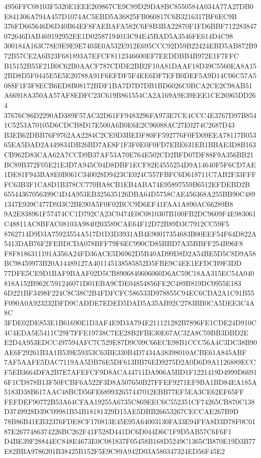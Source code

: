 \documentclass[UTF8,fontset=fandol,zihao=-4,a4paper]{ctexart}
\begin{document}
{{4956FFC08103F5320E1EEE269867CE9C89D29DA8BC8550584A034A77A27DB0E841306A794A457D1074AC5EBD5A36825FB060817C6B3216317BF6EC9B
376FD665646D6D40B64EF8FAEBAFA582C6F8B3BA22870F1FD6BBF712283847072646DAB469192952EE1D02587194013C94E45BAD5A3546FE614D4C98
300184A163C78E9E9E9E7403E0A532E912E695CCC92D59B22424EBD5AB872B972B57CE2A6B23F681893A7EFCF8112346600EF7EEDDBB4B972E1F7FFC
B15152B55F21B0C62B0AACF787CDDE2BB2F10A81DAAF18D39C5560EA8A152BD8D5F0445E5E5E20788A91F6EFDF5F4EE6DF7EFB0DEF5A9D14C06C57A5
088F1F3F8ECB6ED8B08172BDF1BA7D7D7DB1BD6026C0BCA2CE2C98AB51A66918A350AA57AF8EDFC23C619B861554CA2A169A9E39EEE1CE26965DD264
37676C86D2290AD389F57AC32D61FF9483296FA973E7CE4CCC4E3767D97B8541C5253A70105D6CDCB8D17E500A6B0E6E2C96088AC27E0274C2687D43
B3EB62DBB76F9762AA2284C2CE9D3BEDF80FF592776F0FD09EEA78117B05365EA5DAD2A449834DB26BD7AE8F1F3F0E0F0FD7EBE631EB1BBAE3D8B163
CB962D83CAA62A7CCD9B37AF53A70E764E502CD2BFD07DF88F9A356BB21BC89B372F05E21E3D7A945C04D8DBF1ECF82E4555254D9A14640F5F6CD7AE
1DE81F943BA8E0B061C340028D9423CE024C557FBFC6D618711C7AB2F33FFFFC63B3F1CA8D1B378CC770BA8CB1EB4ABA74E95897559B6512EFDEBD2B
65544367056399C4D4A953EB325635126DBA64D5758CAE456368A255BB90C4891347E939C477D933C2BE90A5F0F02BCC9D6EF41FAA1A890AC66289B8
9A2E838961F57474CC1D792CA23C0474E0C0810307B100FB2DC9609F4E983061C48811AC8BFAC08103A9840203589CAE64F12D72B89D3C7912CC59F5
8762714D9D3A75923554A517D1D3D3931AB4E90017354683B00EEF54F64D822A5413DAB76F2FEBDCDA078BFF79F6EC990CD85BBD7A35BBFF254B96F8
F8F8186311191A356A24FD36ACE5D6962D5B40AD99D8D2A54BE5D5C8D9A58BC98459973B20A14489127A401145138585852D5FBE9C4EE1EFDCB9F3DD
77DFE5CE9D1BAF9BAAF02D5CB8906840606060D6AC59C18AA315EC54A040818A152B962C591246071D01EBA9CDE04854856FE2C489B819DC0955E183
6D221BF3498F224C8C38C2B4FDFCFC586533D978855C94EC6CDA2A1C91B55F090A0A923232DFD9CADDE7EDED5DAD5A35AB92C2783BB0CA5DEE3C4A8C
3FDE02DE853E1B61690E1D3AF4E9D3A794E211121282B7896FE1CDE24D910C4C4EDA5E5411C29F7FFE19738C7EE28B2FBE30E67AC32A8C59BB3DBD2E
E2D4A953EDCC497594AFC7C529E87D9C09C66ECE98B1CCC56A4C3DC38B90AE6F29261B3A1B539E59353C63BE330B4D7434A38398010ACBE61A845ABF
7AF5AAFE5DAC7119AA5DB76E5DF613BB76ED9275D2A0D6D9A1126889ECCF5EB3664DFA2B7E7AFEFCF9D8ACA44711DA906A5BD1F1221419D4999D6691
6F1CD878B13F50FCBF6A522F3D8A507650B27FFEF9271EF9BA1BD84EA185A5183D38B617AAC48BCD56FE689932657447012EBB77EF5EA3CE62EF65FF
FEFDEF90772B53A64CFAA19255A6735C869EEC6C552351CF74265CB870C138D3749928D39C09981B54B18181329D15AE5DBB26653267CECCAE267B9D
78B86B41EB32376FDE8CF170813E45E95A64003130FA33E94FFA8D3D78F0C0187E2677486374226BC262F41F528D441DC6D044D6C1F9D5AB57C6F6F1
D4BE39F28844EC848E4673E0C081837F05458B168D5249C1365CB870E19D3B77E82BBA9786201B38425B152F5E9C89A942D03A580347324ED56F45E2
}}
\end{document}
